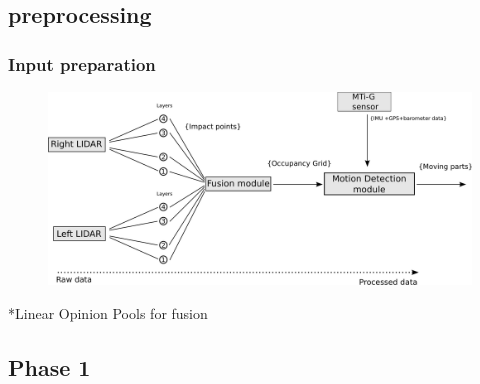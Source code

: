 \documentclass{beamer}
\begin{document}
\subsection{preprocessing}

	\begin{frame}
		\frametitle{Input preparation}
		\begin{figure}[h]
			\center
			\includegraphics[scale=0.18]{../img/fig:motion:framework}
		\end{figure}
		
		*Linear Opinion Pools \cite{ADARVE-2012-671211} for fusion
	
	\end{frame}

\subsection{Phase 1}
\end{document}
